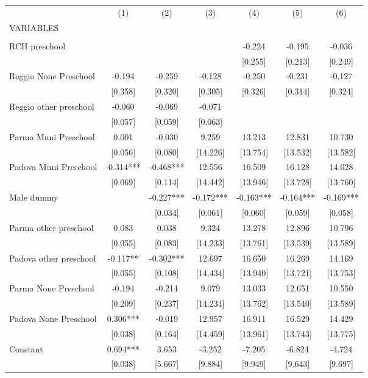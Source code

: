 \begin{tabular}{lcccccc} \hline
 & (1) & (2) & (3) & (4) & (5) & (6) \\
VARIABLES &  &  &  &  &  &  \\ \hline
 &  &  &  &  &  &  \\
RCH preschool &  &  &  & -0.224 & -0.195 & -0.036 \\
 &  &  &  & [0.255] & [0.213] & [0.249] \\
Reggio None Preschool & -0.194 & -0.259 & -0.128 & -0.250 & -0.231 & -0.127 \\
 & [0.358] & [0.320] & [0.305] & [0.326] & [0.314] & [0.324] \\
Reggio other preschool & -0.060 & -0.069 & -0.071 &  &  &  \\
 & [0.057] & [0.059] & [0.063] &  &  &  \\
Parma Muni Preschool & 0.001 & -0.030 & 9.259 & 13.213 & 12.831 & 10.730 \\
 & [0.056] & [0.080] & [14.226] & [13.754] & [13.532] & [13.582] \\
Padova Muni Preschool & -0.314*** & -0.468*** & 12.556 & 16.509 & 16.128 & 14.028 \\
 & [0.069] & [0.114] & [14.442] & [13.946] & [13.728] & [13.760] \\
Male dummy &  & -0.227*** & -0.172*** & -0.163*** & -0.164*** & -0.169*** \\
 &  & [0.034] & [0.061] & [0.060] & [0.059] & [0.058] \\
Parma other preschool & 0.083 & 0.038 & 9.324 & 13.278 & 12.896 & 10.796 \\
 & [0.055] & [0.083] & [14.233] & [13.761] & [13.539] & [13.589] \\
Padova other preschool & -0.117** & -0.302*** & 12.697 & 16.650 & 16.269 & 14.169 \\
 & [0.055] & [0.108] & [14.434] & [13.940] & [13.721] & [13.753] \\
Parma None Preschool & -0.194 & -0.214 & 9.079 & 13.033 & 12.651 & 10.550 \\
 & [0.209] & [0.237] & [14.234] & [13.762] & [13.540] & [13.589] \\
Padova None Preschool & 0.306*** & -0.019 & 12.957 & 16.911 & 16.529 & 14.429 \\
 & [0.038] & [0.164] & [14.459] & [13.961] & [13.743] & [13.775] \\
Constant & 0.694*** & 3.653 & -3.252 & -7.205 & -6.824 & -4.724 \\
 & [0.038] & [5.667] & [9.884] & [9.949] & [9.643] & [9.697] \\

\end{tabular}
